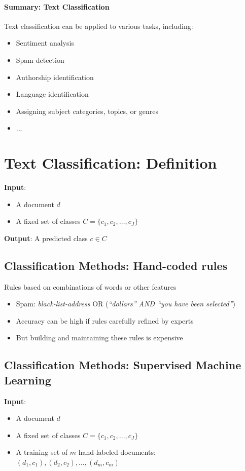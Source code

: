 \documentclass{book}
\begin{document}
\paragraph{Summary: Text Classification}
    Text classification can be applied to various tasks, including:
    \begin{itemize}
        \item Sentiment analysis
        \item Spam detection
        \item Authorship identification
        \item Language identification
        \item Assigning subject categories, topics, or genres
        \item ...
    \end{itemize}


\section{Text Classification: Definition}
    \textbf{Input}:
    \begin{itemize}
        \item A document $d$
        \item A fixed set of classes $C = \{c_1, c_2, \ldots, c_J\}$
    \end{itemize}
    
    \textbf{Output}: A predicted class $c \in C$


\subsection{Classification Methods: Hand-coded rules}
    Rules based on combinations of words or other features
    \begin{itemize}
        \item Spam: \textit{black-list-address} OR (\textit{“dollars” AND “you have been selected”})
        \item Accuracy can be high if rules carefully refined by experts
        \item But building and maintaining these rules is expensive
    \end{itemize}

\subsection{Classification Methods: Supervised Machine Learning}
    \textbf{Input}:
    \begin{itemize}
        \item A document $d$
        \item A fixed set of classes $C = \{c_1, c_2, \ldots, c_J\}$
        \item A training set of $m$ hand-labeled documents: $(d_1, c_1), (d_2, c_2), \ldots, (d_m, c_m)$
    \end{itemize}
    
\end{document}
